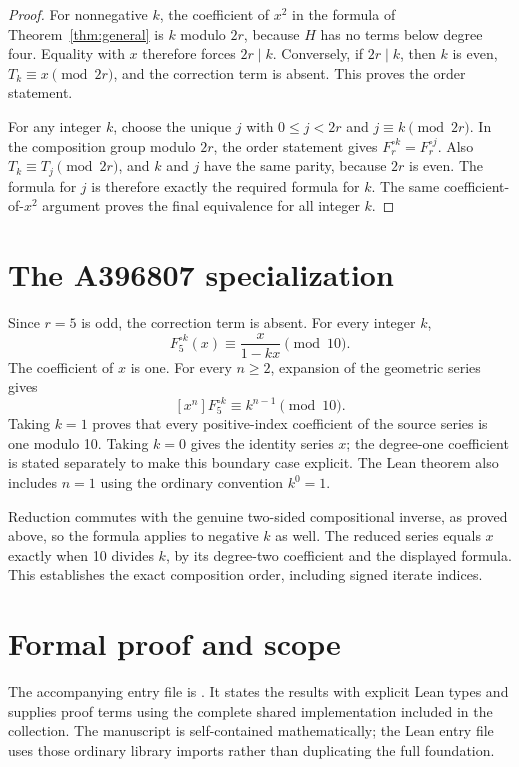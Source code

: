 \documentclass[11pt,a4paper]{article}
\theoremstyle{remark}\newtheorem{remark}[theorem]{Remark}
\begin{document}
\begin{proof}
For nonnegative $k$, the coefficient of $x^2$ in the formula of
Theorem~\ref{thm:general} is $k$ modulo $2r$, because $H$ has
no terms below degree four. Equality with $x$ therefore forces
$2r\mid k$. Conversely, if $2r\mid k$, then $k$ is even,
$T_k\equiv x\pmod{2r}$, and the correction term is absent.
This proves the order statement.

For any integer $k$, choose the unique $j$ with
$0\le j<2r$ and $j\equiv k\pmod{2r}$. In the composition group
modulo $2r$, the order statement gives
$F_r^{\circ k}=F_r^{\circ j}$. Also $T_k\equiv T_j\pmod{2r}$,
and $k$ and $j$ have the same parity, because $2r$ is even.
The formula for $j$ is therefore exactly the required formula for
$k$. The same coefficient-of-$x^2$ argument proves the final
equivalence for all integer $k$.
\end{proof}


\section{The A396807 specialization}
Since $r=5$ is odd, the correction term is absent. For
every integer $k$,
\[
F_{5}^{\circ k}(x)\equiv\frac{x}{1-kx}
\pmod{10}.
\]
The coefficient of $x$ is one. For every $n\ge2$, expansion of the
geometric series gives
\[
[x^n]F_{5}^{\circ k}\equiv k^{n-1}
\pmod{10}.
\]
Taking $k=1$ proves that every positive-index coefficient of the source
series is one modulo 10. Taking $k=0$ gives the
identity series $x$; the degree-one coefficient is stated separately
to make this boundary case explicit. The Lean theorem also includes
$n=1$ using the ordinary convention $k^0=1$.

Reduction commutes with the genuine two-sided compositional inverse,
as proved above, so the formula applies to negative $k$ as well.
The reduced series equals $x$ exactly when 10 divides
$k$, by its degree-two coefficient and the displayed formula. This
establishes the exact composition order, including signed iterate indices.

\section{Formal proof and scope}
The accompanying entry file is .
It states the results with explicit Lean types and supplies proof terms
using the complete shared implementation included in the collection.
The manuscript is self-contained mathematically; the Lean entry file uses
those ordinary library imports rather than duplicating the full foundation.
\end{document}
